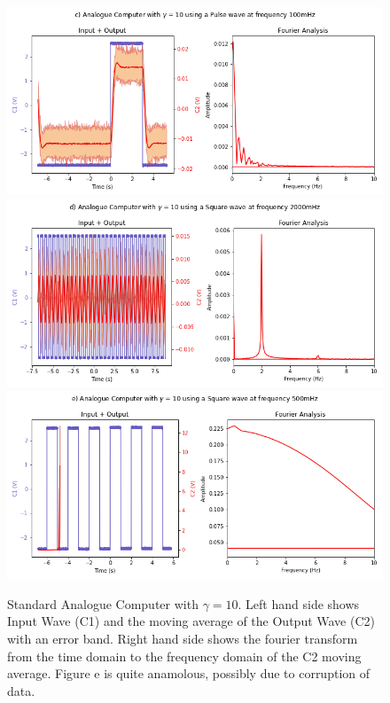 \documentclass[journal]{Imperial_lab_report}
\begin{document}
\begin{appendices}
\begin{figure}
            \includegraphics[scale = 0.30]{G 10 P_100.png}
            \includegraphics[scale = 0.30]{G 10 S_2000.png}
            \includegraphics[scale = 0.30]{G 10 S_500.png}
            \caption{Standard Analogue Computer with $\gamma = 10$. Left hand side shows Input Wave (C1) and the moving average of the Output Wave (C2) with an error band. Right hand side shows the fourier transform from the time domain to the frequency domain of the C2 moving average. Figure e is quite anamolous, possibly due to corruption of data.}
        \end{figure}
        \begin{figure}

\end{figure}
\end{appendices}
\end{document}
